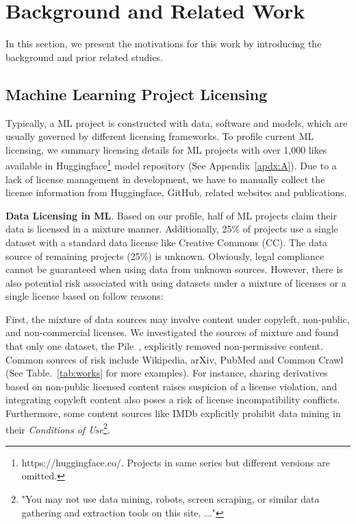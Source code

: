 \section{Background and Related Work}
\label{sec:related}
In this section, we present the motivations for this work by introducing the background and prior related studies.

\subsection{Machine Learning Project Licensing}
Typically, a ML project is constructed with data, software and models, which are usually governed by different licensing frameworks.
To profile current ML licensing, we summary licensing details for ML projects with over 1,000 likes available in Huggingface\footnote{https://huggingface.co/. Projects in same series but different versions are omitted.} model repository (See Appendix~\ref{apdx:A}).
Due to a lack of license management in development, we have to manually collect the license information from Huggingface, GitHub, related websites and publications.

\textbf{Data Licensing in ML}.
Based on our profile, half of ML projects claim their data is licensed in a mixture manner.
Additionally, 25\% of projects use a single dataset with a standard data license like Creative Commons (CC).
The data source of remaining projects (25\%) is unknown.
Obviously, legal compliance cannot be guaranteed when using data from unknown sources. 
However, there is also potential risk associated with using datasets under a mixture of licenses or a single license based on follow reasons:

First, the mixture of data sources may involve content under copyleft, non-public, and non-commercial licenses. 
We investigated the sources of mixture and found that only one dataset, the Pile~\cite{gao2020the}, explicitly removed non-permissive content.
Common sources of risk include Wikipedia, arXiv, PubMed and Common Crawl~\cite{henderson2023foundation} (See Table.~\ref{tab:works} for more examples).
For instance, sharing derivatives based on non-public licensed content raises suspicion of a license violation, and integrating copyleft content also poses a risk of license incompatibility conflicts.
Furthermore, some content sources like IMDb explicitly prohibit data mining in their \textit{Conditions of Use}\footnote{"You may not use data mining, robots, screen scraping, or similar data gathering and extraction tools on this site, ..."}.

